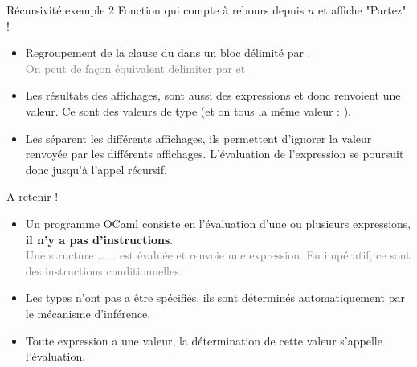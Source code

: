 \documentclass[10pt]{beamer}
\begin{document}
\begin{frame}{\Ctitle}{\stitle}
	\begin{exampleblock}{Récursivité exemple 2}
		Fonction qui compte à rebours depuis $n$ et affiche "Partez" !
		\begin{itemize}
			\item<2-> Regroupement de la clause du  dans un bloc délimité par \kw{(} \kw{)}. \\
				\textcolor{gray}{On peut de façon équivalent délimiter par  et }
			\item<3-> Les résultats des affichages, sont aussi des expressions et donc renvoient une valeur. Ce sont des valeurs  de type  (et on tous la même valeur : \kw{()}).
			\item<4-> Les \kw{;} séparent les différents affichages, ils permettent d'ignorer la valeur renvoyée par les différents affichages. L'évaluation de l'expression se poursuit donc jusqu'à l'appel récursif.
		\end{itemize}
	\end{exampleblock}
\end{frame}

\begin{frame}{\Ctitle}{\stitle}
	\begin{block}{\textcolor{yellow}{\danger} A retenir !}
		\begin{itemize}
			\item<1-> Un programme OCaml consiste en l'évaluation d'une ou plusieurs expressions, \textbf{il n'y a pas d'instructions}.\\
				\onslide<2->\textcolor{gray}{Une structure  \dots {} \dots {} est évaluée et renvoie une expression. En impératif, ce sont des instructions conditionnelles.}
			\item<2-> Les types n'ont pas a être spécifiés, ils sont déterminés automatiquement par le mécanisme d'inférence.
			\item<3-> Toute expression a une valeur, la détermination de cette valeur s'appelle l'évaluation.
		\end{itemize}
	\end{block}
\end{frame}
\end{document}

